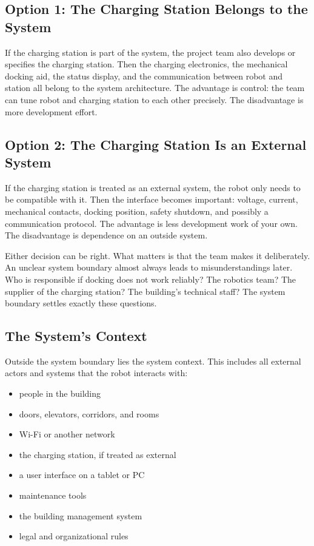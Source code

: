 \subsection{Option 1: The Charging Station Belongs to the System}
If the charging station is part of the system, the project team also develops or specifies the charging station. Then the charging electronics, the mechanical docking aid, the status display, and the communication between robot and station all belong to the system architecture. The advantage is control: the team can tune robot and charging station to each other precisely. The disadvantage is more development effort.

\subsection{Option 2: The Charging Station Is an External System}
If the charging station is treated as an external system, the robot only needs to be compatible with it. Then the interface becomes important: voltage, current, mechanical contacts, docking position, safety shutdown, and possibly a communication protocol. The advantage is less development work of your own. The disadvantage is dependence on an outside system.

Either decision can be right. What matters is that the team makes it deliberately. An unclear system boundary almost always leads to misunderstandings later. Who is responsible if docking does not work reliably? The robotics team? The supplier of the charging station? The building's technical staff? The system boundary settles exactly these questions.

\subsection{The System's Context}
Outside the system boundary lies the system context. This includes all external actors and systems that the robot interacts with:

\begin{itemize}
    \item people in the building
    \item doors, elevators, corridors, and rooms
    \item Wi-Fi or another network
    \item the charging station, if treated as external
    \item a user interface on a tablet or PC
    \item maintenance tools
    \item the building management system
    \item legal and organizational rules
\end{itemize}

